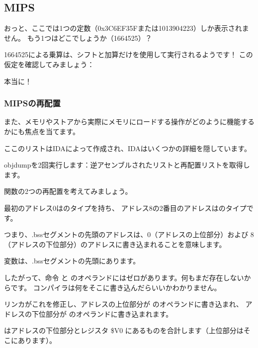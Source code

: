 ﻿\subsection{MIPS}



おっと、ここでは1つの定数（0x3C6EF35Fまたは1013904223）しか表示されません。 
もう1つはどこでしょうか（1664525）？

1664525による乗算は、シフトと加算だけを使用して実行されるようです！ 
この仮定を確認してみましょう：





本当に！

\subsubsection{MIPSの再配置}

また、メモリやストアから実際にメモリにロードする操作がどのように機能するかにも焦点を当てます。

ここのリストはIDAによって作成され、IDAはいくつかの詳細を隠しています。

objdumpを2回実行します：逆アセンブルされたリストと再配置リストを取得します。



関数の2つの再配置を考えてみましょう。

最初のアドレス0はのタイプを持ち、
アドレス8の2番目のアドレスはのタイプです。

つまり、.bssセグメントの先頭のアドレスは、0（アドレスの上位部分）および
8（アドレスの下位部分）のアドレスに書き込まれることを意味します。

変数は、.bssセグメントの先頭にあります。

したがって、命令 \LUI と \SW のオペランドにはゼロがあります。何もまだ存在しないからです。
コンパイラは何をそこに書き込んだらいいかわかりません。

リンカがこれを修正し、アドレスの上位部分が \LUI のオペランドに書き込まれ、
アドレスの下位部分が \SW のオペランドに書き込まれます。

\SW はアドレスの下位部分とレジスタ \$V0 にあるものを合計します（上位部分はそこにあります）。

